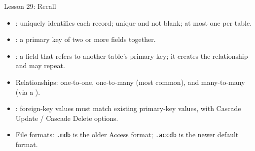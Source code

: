 \documentclass[aspectratio=169]{beamer}
\begin{document}
\begin{frame}{Lesson 29: Recall}
  \begin{itemize}
    \item {}: uniquely identifies each record; unique and not
      blank; at most one per table.
    \item {}: a primary key of two or more fields together.
    \item {}: a field that refers to another table's primary
      key; it creates the relationship and may repeat.
    \item Relationships: one-to-one, one-to-many (most common), and
      many-to-many (via a ).
    \item {}: foreign-key values must match existing
      primary-key values, with Cascade Update / Cascade Delete options.
    \item File formats: \texttt{.mdb} is the older Access format;
      \texttt{.accdb} is the newer default format.
  \end{itemize}
\end{frame}
\end{document}

